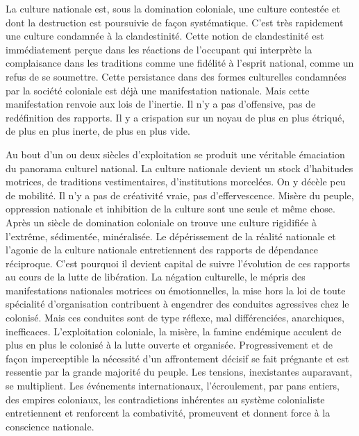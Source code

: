 \documentclass[french,twoside]{book} %
\begin{document}
\bigbreak
\noindent La culture nationale est, sous la domination coloniale, une culture contestée et dont la destruction est poursuivie de façon systématique. C’est très rapidement une culture condamnée à la clandestinité. Cette notion de clandestinité est immédiatement perçue dans les réactions de l’occupant qui interprète la complaisance dans les traditions comme une fidélité à l’esprit national, comme un refus de se soumettre. Cette persistance dans des formes culturelles condamnées par la société coloniale est déjà une manifestation nationale. Mais cette manifestation renvoie aux lois de l’inertie. Il n’y a pas d’offensive, pas de redéfinition des rapports. Il y a crispation sur un noyau de plus en plus étriqué, de plus en plus inerte, de plus en plus vide.\par
 Au bout d’un ou deux siècles d’exploitation se produit une véritable émaciation du panorama culturel national. La culture nationale devient un stock d’habitudes motrices, de traditions vestimentaires, d’institutions morcelées. On y décèle peu de mobilité. Il n’y a pas de créativité vraie, pas d’effervescence. Misère du peuple, oppression nationale et inhibition de la culture sont une seule et même chose. Après un siècle de domination coloniale on trouve une culture rigidifiée à l’extrême, sédimentée, minéralisée. Le dépérissement de la réalité nationale et l’agonie de la culture nationale entretiennent des rapports de dépendance réciproque. C’est pourquoi il devient capital de suivre l’évolution de ces rapports au cours de la lutte de libération. La négation culturelle, le mépris des manifestations nationales motrices ou émotionnelles, la mise hors la loi de toute spécialité d’organisation contribuent à engendrer des conduites agressives chez le colonisé. Mais ces conduites sont de type réflexe, mal différenciées, anarchiques, inefficaces. L’exploitation coloniale, la misère, la famine endémique acculent de plus en plus le colonisé à la lutte ouverte et organisée. Progressivement et de façon imperceptible la nécessité d’un affrontement décisif se fait prégnante et est ressentie par la grande majorité du peuple. Les tensions, inexistantes auparavant, se multiplient. Les événements internationaux, l’écroulement, par pans entiers, des empires coloniaux, les contradictions inhérentes au système colonialiste entretiennent et renforcent la combativité, promeuvent et donnent force à la conscience nationale.\par
\bigbreak
\end{document}
